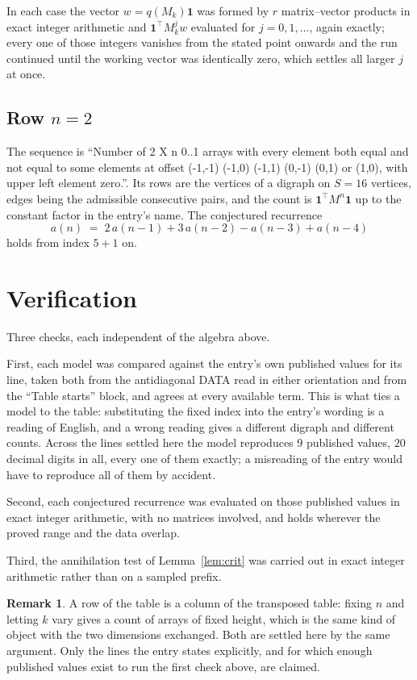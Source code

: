 \documentclass[11pt,a4paper]{article}
\theoremstyle{plain}
\theoremstyle{definition}
\newtheorem{remark}[theorem]{Remark}
\begin{document}
In each case the vector $w=q(M_k)\mathbf{1}$ was formed by $r$ matrix--vector products in
exact integer arithmetic and $\mathbf{1}^{\!\top}M_k^{j}w$ evaluated for $j=0,1,\dots$,
again exactly; every one of those integers vanishes from the stated point onwards and the run
continued until the working vector was identically zero, which settles all larger $j$ at once.

\subsection*{Row $n$$=2$}
The sequence is ``Number of 2 X n 0..1 arrays with every element both equal and not equal to some elements at offset (-1,-1) (-1,0) (-1,1) (0,-1) (0,1) or (1,0), with upper left element zero.''. Its rows are the vertices of a digraph on
$S=16$ vertices, edges being the admissible consecutive pairs, and the count is
$\mathbf{1}^{\!\top}M^{n}\mathbf{1}$ up to the constant factor in the entry's name.
The conjectured recurrence
\[
a(n)\;=\;2\,a(n-1) + 3\,a(n-2) - a(n-3) + a(n-4)
\]
holds from index $5+1$ on.

\section{Verification}

Three checks, each independent of the algebra above.

First, each model was compared against the entry's own published values for its line, taken
both from the antidiagonal DATA read in either orientation and from the ``Table starts''
block, and agrees at every available term. This is what ties a model to the table:
substituting the fixed index into the entry's wording is a reading of English, and a wrong
reading gives a different digraph and different counts. Across the lines settled here the
model reproduces $9$ published values, $20$ decimal digits in all, every one of
them exactly; a misreading of the entry would have to reproduce all of them by accident.

Second, each conjectured recurrence was evaluated on those published values in exact
integer arithmetic, with no matrices involved, and holds wherever the proved range and the
data overlap.

Third, the annihilation test of Lemma~\ref{lem:crit} was carried out in exact integer
arithmetic rather than on a sampled prefix.

\begin{remark}
A row of the table is a column of the transposed table: fixing $n$ and letting $k$ vary gives a
count of arrays of fixed height, which is the same kind of object with the two dimensions
exchanged. Both are settled here by the same argument. Only the lines the entry states
explicitly, and for which enough published values exist to run the first check above, are
claimed.
\end{remark}
\end{document}
